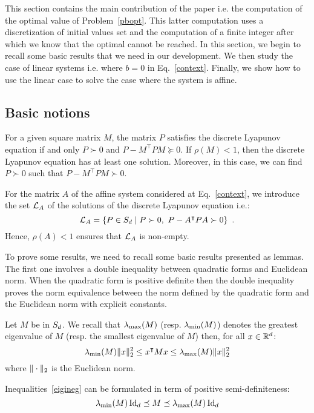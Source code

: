 \documentclass[10pt]{article}
\begin{document}
This section contains the main contribution of the paper i.e. the computation of the optimal value of Problem~\eqref{pbopt}. This latter computation uses a discretization of initial values set and the computation of a finite integer after which we know that the optimal cannot be reached. In this section, we begin to recall some basic results that we need in our development. We then study the case of linear systems i.e. where $b=0$ in Eq.~\eqref{context}. Finally, we show how to use the linear case to solve the case where the system is affine.   
\subsection{Basic notions}

For a given square matrix $M$, the matrix $P$ satisfies the discrete Lyapunov equation if and only $P\succ 0$ and $P-M^\intercal P M\succeq 0$. If $\rho(M)<1$, then the discrete Lyapunov equation has at least one solution. Moreover, in this case, we can find $P\succ 0$ such that $P-M^\intercal P M\succ 0$.  

For the matrix $A$ of the affine system considered at Eq.~\eqref{context}, we introduce the set $\mathcal{L}_{A}$ of the  solutions  of the discrete Lyapunov equation i.e.:
\[
\mathcal{L}_{A}=\{P\in S_d \mid P\succ 0,\ P-A^\intercal P A\succ 0\}\enspace .
\]
Hence, $\rho(A)<1$ ensures that $\mathcal{L}_{A}$ is non-empty.

To prove some results, we need to recall some basic results presented as lemmas. The first one involves a double inequality between quadratic forms and Euclidean norm. When the quadratic form is positive definite then the double inequality proves the norm equivalence between the norm defined by the quadratic form and the Euclidean norm with explicit constants. 
\begin{lemma}
\label{lemma1}
Let $M$ be in $S_d$. We recall that $\lambda_{\operatorname{max}}(M)$ (resp. $\lambda_{\operatorname{min}}(M)$) denotes the greatest eigenvalue of $M$ (resp. the smallest eigenvalue of $M$) then, for all $x\in \mathbb R^d$:
\begin{equation}
\label{eigineg}
\lambda_{\operatorname{min}}(M)\| x\|_2^2\leq x^\intercal M x\leq \lambda_{\operatorname{max}}(M) \| x\|_2^2
\end{equation}
where $\| \cdot\|_2$ is the Euclidean norm. 
\end{lemma}
Inequalities~\eqref{eigineg} can be formulated in term of positive semi-definiteness:
\[
\lambda_{\operatorname{min}}(M)\operatorname{Id}_d\preceq M\preceq \lambda_{\operatorname{max}}(M)\operatorname{Id}_d
\]
\end{document}
